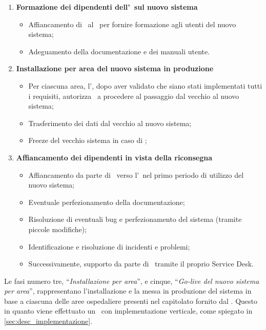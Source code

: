 \begin{enumerate}
		\item \textbf{Formazione dei dipendenti dell'\istituto~sul nuovo sistema}
			\begin{itemize}[noitemsep]
				\renewcommand\labelitemi{--}
				\item Affiancamento di \azienda~al \proponente~per fornire formazione agli utenti del nuovo sistema;
				\item Adeguamento della documentazione e dei manuali utente.
			\end{itemize}
		
		\item \textbf{Installazione per area del nuovo sistema in produzione}
			\begin{itemize}[noitemsep]
				\renewcommand\labelitemi{--}
				\item Per ciascuna area, l'\istituto, dopo aver validato che siano stati implementati tutti i requisiti, autorizza \azienda~a procedere al passaggio dal vecchio al nuovo sistema;
				\item Trasferimento dei dati dal vecchio al nuovo sistema;
				\item Freeze del vecchio sistema in caso di \rollback;
			\end{itemize}
		
		\item \textbf{Affiancamento dei dipendenti in vista della riconsegna}
			\begin{itemize}[noitemsep]
				\renewcommand\labelitemi{--}
				\item Affiancamento da parte di \azienda~verso l'\istituto~nel primo periodo di utilizzo del nuovo sistema;
				\item Eventuale perfezionamento della documentazione;
				\item Risoluzione di eventuali bug e perfezionamento del sistema (tramite piccole modifiche);
				\item Identificazione e risoluzione di incidenti e problemi;
				\item Successivamente, supporto da parte di \azienda~tramite il proprio Service Desk.
			\end{itemize}
		
	\end{enumerate}

	Le fasi numero tre, ``\textit{Installazione per area}'', e cinque, ``\textit{Go-live del nuovo sistema per area}'', rappresentano l'installazione e la messa in produzione del sistema in base a ciascuna delle aree ospedaliere presenti nel capitolato fornito dal \proponente.
	Questo in quanto viene effettuato un \rollout~con implementazione verticale, come spiegato in \ref{sec:desc_implementazione}.
	
